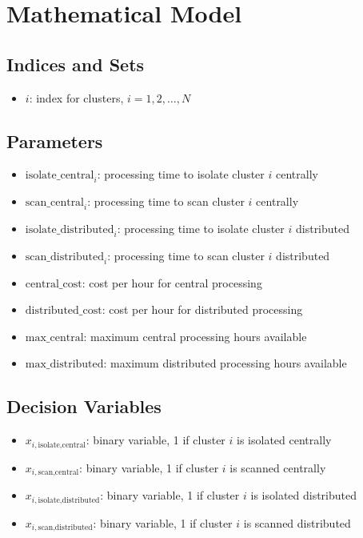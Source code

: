 \documentclass{article}
\begin{document}
\section*{Mathematical Model}

\subsection*{Indices and Sets}
\begin{itemize}
    \item \( i \): index for clusters, \( i = 1, 2, \ldots, N \)
\end{itemize}

\subsection*{Parameters}
\begin{itemize}
    \item \( \text{isolate\_central}_i \): processing time to isolate cluster \( i \) centrally
    \item \( \text{scan\_central}_i \): processing time to scan cluster \( i \) centrally
    \item \( \text{isolate\_distributed}_i \): processing time to isolate cluster \( i \) distributed
    \item \( \text{scan\_distributed}_i \): processing time to scan cluster \( i \) distributed
    \item \( \text{central\_cost} \): cost per hour for central processing
    \item \( \text{distributed\_cost} \): cost per hour for distributed processing
    \item \( \text{max\_central} \): maximum central processing hours available
    \item \( \text{max\_distributed} \): maximum distributed processing hours available
\end{itemize}

\subsection*{Decision Variables}
\begin{itemize}
    \item \( x_{i,\text{isolate,central}} \): binary variable, 1 if cluster \( i \) is isolated centrally
    \item \( x_{i,\text{scan,central}} \): binary variable, 1 if cluster \( i \) is scanned centrally
    \item \( x_{i,\text{isolate,distributed}} \): binary variable, 1 if cluster \( i \) is isolated distributed
    \item \( x_{i,\text{scan,distributed}} \): binary variable, 1 if cluster \( i \) is scanned distributed
\end{itemize}
\end{document}
